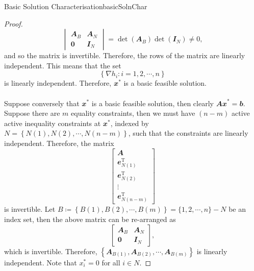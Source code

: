 \documentclass[math, code]{amznotes}
\theoremstyle{remark}
\begin{document}
\begin{thmbox}{Basic Solution Characterisation}{basicSolnChar}
\begin{proof}
        \begin{equation*}
            \begin{vmatrix}
                \mathbfit{A}_B & \mathbfit{A}_N \\
                \mathbf{0} & \mathbfit{I}_N
            \end{vmatrix} = \det(\mathbfit{A}_B)\det(\mathbfit{I}_N) \neq 0,
        \end{equation*}
        and so the matrix is invertible. Therefore, the rows of the matrix are linearly independent. This means that the set 
        \begin{equation*}
            \left\{\nabla h_i \colon i = 1, 2, \cdots, n\right\}
        \end{equation*}
        is linearly independent. Therefore, $\mathbfit{x}^*$ is a basic feasible solution.
        \\\\
        Suppose conversely that $\mathbfit{x}^*$ is a basic feasible solution, then clearly $\mathbfit{Ax}^* = \mathbfit{b}$. Suppose there are $m$ equality constraints, then we must have $(n - m)$ active active inequality constraints at $\mathbfit{x}^*$, indexed by $N = \left\{N(1), N(2), \cdots, N(n - m)\right\}$, such that the constraints are linearly independent. Therefore, the matrix
        \begin{equation*}
            \begin{bmatrix}
                \mathbfit{A} \\
                \mathbfit{e}^{\mathrm{T}}_{N(1)} \\
                \mathbfit{e}^{\mathrm{T}}_{N(2)} \\
                \vdots \\
                \mathbfit{e}^{\mathrm{T}}_{N(n - m)}
            \end{bmatrix}
        \end{equation*}
        is invertible. Let $B \coloneqq \left\{B(1), B(2), \cdots, B(m)\right\} = \{1, 2, \cdots, n\} - N$ be an index set, then the above matrix can be re-arranged as
        \begin{equation*}
            \begin{bmatrix}
                \mathbfit{A}_B & \mathbfit{A}_N \\
                \mathbf{0} & \mathbfit{I}_N
            \end{bmatrix},
        \end{equation*}
        which is invertible. Therefore, $\left\{\mathbfit{A}_{B(1)}, \mathbfit{A}_{B(2)}, \cdots, \mathbfit{A}_{B(m)}\right\}$ is linearly independent. Note that $x^*_i = 0$ for all $i \in N$.
    \end{proof}
\end{thmbox}
\end{document}

